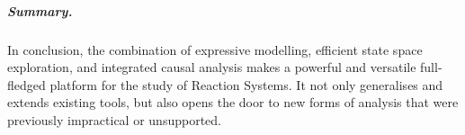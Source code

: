 \subparagraph*{Summary.}
In conclusion, the combination of expressive modelling, efficient state space exploration, and integrated causal analysis makes \GROOVE a powerful and versatile full-fledged platform for the study of Reaction Systems. It not only generalises and extends existing tools, but also opens the door to new forms of analysis that were previously impractical or unsupported.










